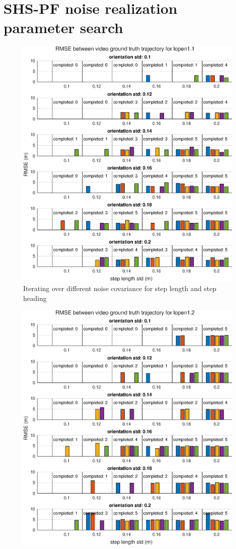 \section{SHS-PF noise realization parameter search}
\begin{figure}[H]
	\centering
	\includegraphics[width=0.7\linewidth]{images/20201107_1311_orientation_std_0_2}
	\caption{Iterating over different noise covariance for step length and step heading  }
	\label{fig:202011071311orientationstd02}
\end{figure}
\begin{figure}[H]
	\centering
	\includegraphics[width=0.7\linewidth]{images/20201107_1312_orientation_std_0_2}
	\caption{}
	\label{fig:202011071312orientationstd02}
\end{figure}


